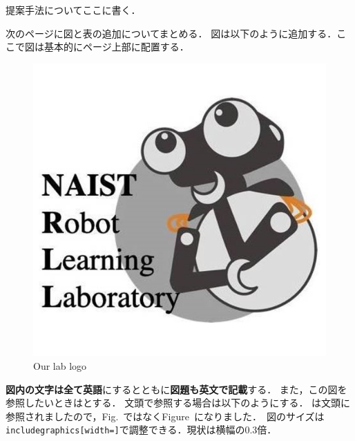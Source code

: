 提案手法についてここに書く．

\vspace{10truemm}
次のページに図と表の追加についてまとめる．
\newpage
図は以下のように追加する．ここで図は基本的にページ上部に配置する．
\begin{figure}[t]
    \centering
    \includegraphics[clip, width=0.3\linewidth]{figures/rll_logo.png}
    \caption{Our lab logo}
    \label{fig: our_logo}
\end{figure}

{\bf 図内の文字は全て英語}にするとともに{\bf 図題も英文で記載}する．
また，この図を参照したいときはとする．
文頭で参照する場合は以下のようにする．
は文頭に参照されましたので，Fig.~ではなくFigure~になりました．\
図のサイズは\texttt{includegraphics[width=]}で調整できる．現状は横幅の$0.3$倍．

